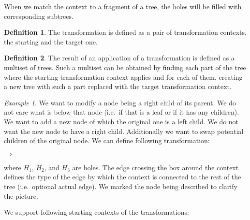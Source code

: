 \documentclass[final]{article}
\theoremstyle{definition}
\newtheorem{definition}{Definition}[subsection]
\theoremstyle{definition}
\theoremstyle{remark}
\newtheorem{example}{Example}[subsection]
\newcommand{\includeinlinescaledsvg}[3]{\begin{minipage}{#1\textwidth}\begin{center}\end{center}\end{minipage}}
\begin{document}
When we match the context to a fragment of a tree, the holes will be filled with corresponding subtrees.

\begin{definition}
    The transformation is defined as a pair of transformation contexts, the starting and the target one.
\end{definition}

\begin{definition}
    The result of an application of a transformation is defined as a multiset of trees. Such a multiset can be obtained by finding each part of the tree where the starting transformation context applies and for each of them, creating a new tree with such a part replaced with the target transformation context.
\end{definition}

\begin{example}%
    \label{ex:transformation}%
    We want to modify a node being a right child of its parent. We do not care what is below that node (i.e.~if that is a leaf or if it has any children). We want to add a new node of which the original one is a left child. We do not want the new node to have a right child. Additionally we want to swap potential children of the original node. We can define following transformation:
    \begin{center}
        \includeinlinescaledsvg{.4}{.7}{lambda__contexts__def_001}%
        \(\Rightarrow\)
        \includeinlinescaledsvg{.4}{.7}{lambda__contexts__def_002}%
    \end{center}
\end{example}

where \(H_1\), \(H_2\), and \(H_3\) are holes. The edge crossing the box around the context defines the type of the edge by which the context is connected to the rest of the tree (i.e.~optional actual edge). We marked the node being described to clarify the picture.

We support following starting contexts of the transformations:
\end{document}
